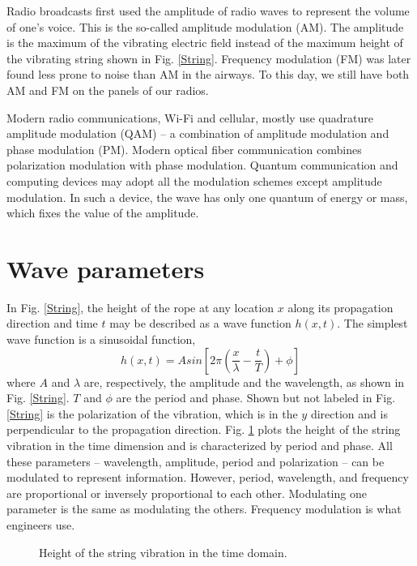 \documentclass[oneside, letter, 12pt]{book}
\begin{document}
Radio broadcasts first used the amplitude of radio waves to represent the volume of one's voice. This is the so-called amplitude modulation (AM). The amplitude is the maximum of the vibrating electric field instead of the maximum height of the vibrating string shown in Fig. \ref{String}. Frequency modulation (FM) was later found less prone to noise than AM in the airways. To this day, we still have both AM and FM on the panels of our radios.

Modern radio communications, Wi-Fi and cellular, mostly use quadrature amplitude modulation (QAM) -- a combination of amplitude modulation and phase modulation (PM). Modern optical fiber communication combines polarization modulation with phase modulation. Quantum communication and computing devices may adopt all the modulation schemes except amplitude modulation. In such a device, the wave has only one quantum of energy or mass, which fixes the value of the amplitude.

\section{Wave parameters}
In Fig. \ref{String}, the height of the rope at any location $x$ along its propagation direction and time $t$ may be described as a wave function $h(x,t)$. The simplest wave function is a sinusoidal function,
\begin{equation}\label{e-hWave1}
    h(x,t) = A sin[2\pi (\frac x \lambda - \frac t T) +\phi]
\end{equation}
where $A$ and $\lambda$ are, respectively, the amplitude and the wavelength, as shown in Fig. \ref{String}. $T$ and $\phi$ are the period and phase. Shown but not labeled in Fig. \ref{String} is the polarization of the vibration, which is in the $y$ direction and is perpendicular to the propagation direction. Fig. \ref{Wave} plots the height of the string vibration in the time dimension and is characterized by period and phase. All these parameters -- wavelength, amplitude, period and polarization -- can be modulated to represent information. However, period, wavelength, and frequency are proportional or inversely proportional to each other. Modulating one parameter is the same as modulating the others. Frequency modulation is what engineers use.

\begin{figure}[h]\label{Wave}
\caption{Height of the string vibration in the time domain.}
\end{figure}
\end{document}
